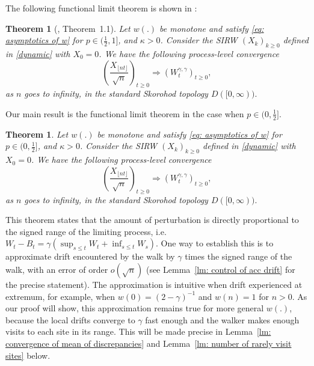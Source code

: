 \documentclass[twoside,12pt, a4paper]{article}
\newtheorem{theorem}{Theorem}[section]
\newtheorem*{theorem*}{Theorem}
\numberwithin{equation}{section}
\theoremstyle{remark}
\begin{document}
\begin{samepage}
	The following functional limit theorem is shown in \cite{KMP23}: 
	\begin{theorem*}[\cite{KMP23}, Theorem~1.1]
			Let $w(.)$ be monotone and satisfy \eqref{eq: asymptotics of w} for $p\in (\frac{1}{2},1]$, and $\kappa >0 $. Consider the SIRW $(X_k)_{k\geq 0}$ defined in \eqref{dynamic} with $X_0 =0$. We have the following process-level convergence
	\[
	\left(  \frac{X_{\lfloor nt \rfloor }}{\sqrt{n}}  \right)_{t\geq 0} \Longrightarrow \left( W^{\gamma,\gamma}_{t}\right)_{t\geq 0},
	\] 
	as $n$ goes to infinity, in the standard Skorohod topology $D([0,\infty) ).$
	\end{theorem*}
\end{samepage}
	\begin{samepage}
		Our main result is the functional limit theorem in the case when $p\in (0,\frac{1}{2}]$.
		\begin{theorem}\label{thm: main}
			Let $w(.)$ be monotone and satisfy \eqref{eq: asymptotics of w} for $p\in (0,\frac{1}{2}]$, and $\kappa >0 $. Consider the SIRW $(X_k)_{k\geq 0}$ defined in \eqref{dynamic} with $X_0 =0$. We have the following process-level convergence
			\[
			\left(  \frac{X_{\lfloor nt \rfloor }}{\sqrt{n}}  \right)_{t\geq 0} \Longrightarrow \left( W^{\gamma,\gamma}_{t}\right)_{t\geq 0},
			\]
	as $n$ goes to infinity, in the standard Skorohod topology $D([0,\infty) ).$
		\end{theorem}
	\end{samepage}

	This theorem states that the amount of perturbation is directly proportional to the signed range of the limiting process, i.e. $W_t - B_t = \gamma \left( \sup_{s \le t} W_t + \inf _{s \le t} W_s \right) $. 
	One way to establish this is to approximate drift encountered by the walk by $\gamma$ times the signed range of the walk, with an error of order $o\left(\sqrt{n} \right)$ (see Lemma~\ref{lm: control of acc drift} for the precise statement). 
	The approximation is intuitive when drift experienced at extremum, for example, when $w(0) = (2 - \gamma)^{-1}$ and $w(n) = 1$ for $n > 0$. 
	As our proof will show, this approximation remains true for more general $w(.)$, because the local drifts converge to $\gamma$ fast enough and the walker makes enough visits to each site in its range. 
	This will be made precise in Lemma~\ref{lm: convergence of mean of discrepancies} and Lemma~\ref{lm: number of rarely visit sites} below. 
\end{document}
